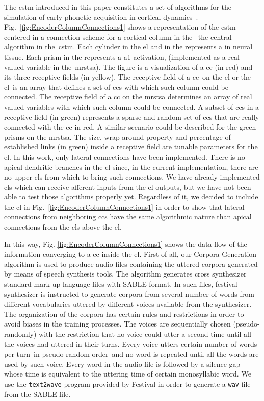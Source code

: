 {The \gls{cstm} introduced in this paper constitutes a set of algorithms for the simulation of early phonetic acquisition in cortical dynamics~\cite{10.1371/journal.pone.0217966}. Fig.~\ref{fig:EncoderColumnConnections1} shows a representation of the \gls{cstm} centered in a connection scheme for a cortical column in the --the central algorithm in the~\gls{cstm}. Each cylinder in the \gls{el} and in the  represents a  in neural tissue. Each prism in the  represents a \gls{a1} activation, (implemented as a real valued variable in the~\gls{mrstsa}). The figure is a visualization of a \gls{cc} (in red) and its three receptive fields (in yellow). The receptive field of a \gls{cc}--on the \gls{el} or the \gls{cl}--is an array that defines a set of \glspl{cc} with which such column could be connected. The receptive field of a \gls{cc} on the \gls{mrstsa} determines an array of real valued variables with which such column could be connected. A subset of \glspl{cc} in a receptive field (in green) represents a sparse and random set of \glspl{cc} that are really connected with the \gls{cc} in red. A similar scenario could be described for the green prisms on the \gls{mrstsa}. The size, wrap-around property and percentage of established links (in green) inside a receptive field are tunable parameters for the \gls{el}. In this work, only lateral connections have been implemented. There is no apical dendritic branches in the \gls{el} since, in the current implementation, there are no upper \glspl{cl} from which to bring such connections. We have already implemented \glspl{cl} which can receive afferent inputs from the \gls{el} outputs, but we have not been able to test those algorithms properly yet. Regardless of it, we decided to include the \gls{cl} in Fig.~\ref{fig:EncoderColumnConnections1} in order to show that lateral connections from neighboring \glspl{cc} have the same algorithmic nature than apical connections from the \glspl{cl} above the \gls{el}.

In this way, Fig. \ref{fig:EncoderColumnConnections1} shows the data flow of the information converging to a \gls{cc} inside the \gls{el}. First of all, our Corpora Generation algorithm is used to produce audio files containing the uttered corpora generated by means of speech synthesis tools. The algorithm generates cross synthesizer standard mark up language files with SABLE \cite{sable} format. In such files, \gls{festival} synthesizer is instructed to generate corpora from several number of words from different vocabularies uttered by different voices available from the synthesizer. The organization of the corpora has certain rules and restrictions in order to avoid biases in the training processes. The voices are sequentially chosen (pseudo-randomly) with the restriction that no voice could utter a second time until all the voices had uttered in their turns. Every voice utters certain number of words per turn--in pseudo-random order--and no word is repeated until all the words are used by such voice. Every word in the audio file is followed by a silence gap whose time is equivalent to the uttering time of certain monosyllabic word. We use the \texttt{text2wave} program provided by Festival in order to generate a \texttt{wav} file from the SABLE file.

}
